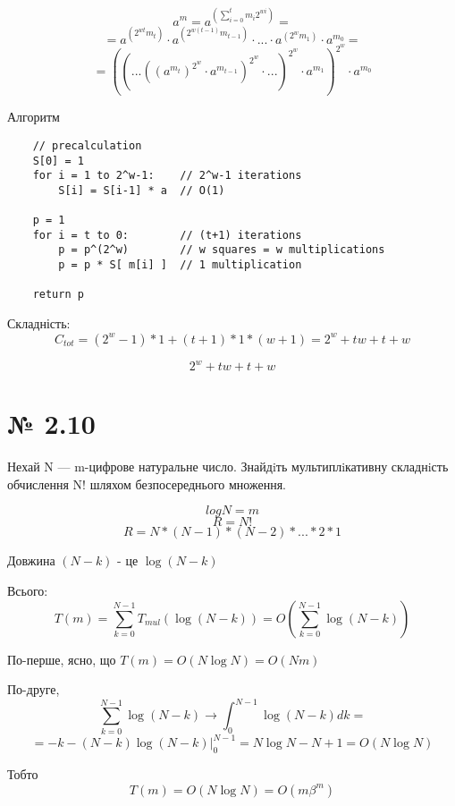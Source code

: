 \documentclass[11pt, a4paper]{article} %
\begin{document}
$$a^m = a^{\left( \sum_{i=0}^{t} m_i 2^{wi} \right)} = $$
$$= a^{(2^{wt}m_t)}\cdot a^{(2^{w(t-1)}m_{t-1})} \cdot ... \cdot a^{(2^{w}m_1)} \cdot a^{m_0} = $$
$$= (( ... ((a^{m_t})^{2^{w}} \cdot a^{m_{t-1}})^{2^{w}} \cdot ... )^{2^{w}} \cdot a^{m_1})^{2^{w}} \cdot a^{m_0}$$

Алгоритм
\begin{lstlisting}
    // precalculation
    S[0] = 1
    for i = 1 to 2^w-1:    // 2^w-1 iterations
        S[i] = S[i-1] * a  // O(1)

    p = 1
    for i = t to 0:        // (t+1) iterations
        p = p^(2^w)        // w squares = w multiplications
        p = p * S[ m[i] ]  // 1 multiplication
    
    return p
\end{lstlisting}

Складність:
$$C_{tot} = (2^w-1) * 1 + (t+1) * 1 * (w + 1) = 2^w + tw + t + w$$

\begin{mdframed}[style=ans]
    $$2^w + tw + t + w$$
\end{mdframed}

\section*{№  2.10}
\begin{mdframed}
    Нехай N — m-цифрове натуральне число. 
    Знайдiть мультиплiкативну складнiсть обчислення N! шляхом безпосереднього множення.
\end{mdframed}

$$log N = m$$
$$R = N!$$
$$R = N*(N-1)*(N-2)* ... * 2 * 1$$

Довжина $(N-k)$ - це $\log (N-k)$

Всього: $$T(m) = \sum_{k=0}^{N-1} T_{mul}(\log (N-k)) = O\left(\sum_{k=0}^{N-1} \log (N-k)\right)$$

По-перше, ясно, що $T(m) = O(N \log N) = O(Nm)$

По-друге, 
$$\sum_{k=0}^{N-1} \log (N-k) \to \int_0^{N-1} \log (N-k) dk = $$
$$= - k - (N-k)\log (N-k) |_0^{N-1} 
= N\log N - N + 1 = O(N\log N)$$

Тобто
$$T(m) = O(N\log N) = O(m\beta^m)$$
\end{document}
